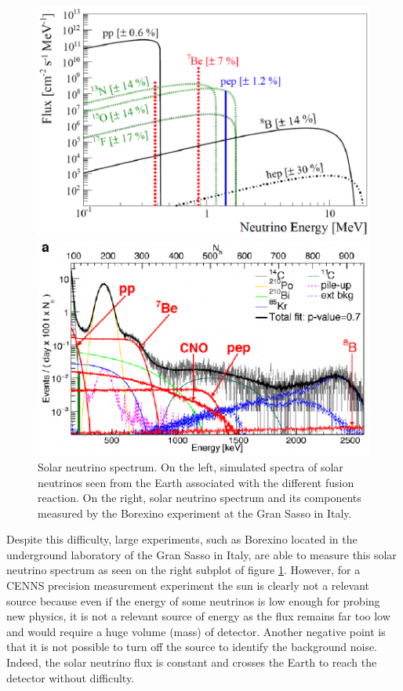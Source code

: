 \begin{figure}
\begin{minipage}{0.48\textwidth}
\includegraphics [scale=1]{Figures/Introduction/solar_neutrino_spectrum_simu.pdf}
\end{minipage}
\hfill
\begin{minipage}{0.48\textwidth}
\includegraphics [scale=1]{Figures/Introduction/solar_neutrino_spectrum_exp.pdf}
\end{minipage}
\caption{Solar neutrino spectrum. On the left, simulated spectra of solar neutrinos seen from
the Earth associated with the different fusion reaction.
On the right, solar neutrino spectrum and its components measured by the Borexino experiment at the Gran Sasso in Italy.}
\label{fig:solar-neutrino-spectrum}
\end{figure}

Despite this difficulty, large experiments, such as Borexino located in the underground laboratory of the Gran Sasso in Italy, are able to measure this solar neutrino spectrum as seen on the right subplot of figure \ref{fig:solar-neutrino-spectrum}. However, for a CENNS precision measurement experiment the sun is clearly not a relevant source because even if the energy of some neutrinos is low enough for probing new physics, it is not a relevant source of energy as the flux remains far too low and would require a huge volume (mass) of detector. Another negative point is that it is not possible to turn off the source to identify the background noise. Indeed, the solar neutrino flux is constant and crosses the Earth to reach the detector without difficulty.

